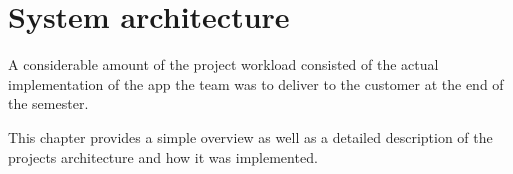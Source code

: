 \chapter{System architecture}
A considerable amount of the project workload consisted of the actual implementation of the app the team was to deliver to the customer at the end of the semester. 

This chapter provides a simple overview as well as a detailed description of the projects architecture and how it was implemented. 






